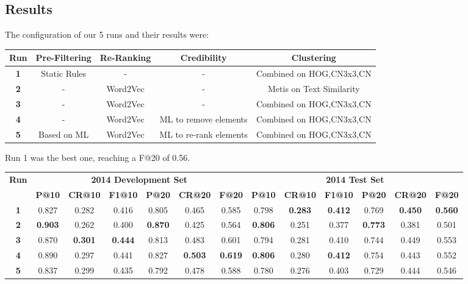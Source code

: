 \documentclass[a0,portrait]{a0poster}
\begin{document}
\begin{multicols}{2}

\color{Navy} %
\section*{Results}
\color{DarkSlateGray} %

The configuration of our 5 runs and their results were:
\begin{center} %
\label{table:config}
\normalsize
\begin{tabular}{c|c|c|c|c}
\toprule 
\textbf{Run} & \textbf{Pre-Filtering} & \textbf{Re-Ranking}  & \textbf{Credibility} & \textbf{Clustering}\tabularnewline
\midrule
\textbf{1} & Static Rules & - & - & Combined on HOG,CN3x3,CN \tabularnewline
\textbf{2} & - & Word2Vec & - & Metis on Text Similarity \tabularnewline
\textbf{3} & - & Word2Vec & - & Combined on HOG,CN3x3,CN \tabularnewline
\textbf{4} & - & Word2Vec &   ML to remove elements & Combined on HOG,CN3x3,CN\tabularnewline
\textbf{5} & Based on ML & Word2Vec  & ML to re-rank elements & Combined on HOG,CN3x3,CN\tabularnewline
\bottomrule 
\end{tabular}
\end{center} %

\vspace{1cm}
Run 1 was the best one, reaching a F@20 of 0.56.
\begin{center}
\normalsize
\begin{tabular}{c||c|c|c|c|c|c||c|c|c|c|c|c}
\toprule 
\multirow{2}{*}{\textbf{Run}} & \multicolumn{6}{c||}{\textbf{2014 Development Set}} & \multicolumn{6}{c}{\textbf{2014 Test Set}}\tabularnewline
\cmidrule{2-13} 
 & \textbf{P@10} & \textbf{CR@10} & \textbf{F1@10} & \textbf{P@20} & \textbf{CR@20} & \textbf{F@20} & \textbf{P@10} & \textbf{CR@10} & \textbf{F1@10} & \textbf{P@20} & \textbf{CR@20} & \textbf{F@20}\tabularnewline
\midrule
\rowcolor{LightCyan}
\textbf{1} & 0.827 & 0.282 & 0.416 & 0.805 & 0.465 & 0.585 & 0.798 & \textbf{0.283}  & \textbf{0.412}  & 0.769  & \textbf{0.450}  & \textbf{0.560} \tabularnewline
\textbf{2} & \textbf{0.903} & 0.262 & 0.400 & \textbf{0.870} & 0.425 & 0.564 & \textbf{0.806} & 0.251  & 0.377  & \textbf{0.773}  & 0.381  & 0.501 \tabularnewline
\textbf{3} & 0.870 & \textbf{0.301} & \textbf{0.444} & 0.813 & 0.483 & 0.601 & 0.794 & 0.281  & 0.410  & 0.744  & 0.449  & 0.553 \tabularnewline
\textbf{4} & 0.890 & 0.297 & 0.441 & 0.827 & \textbf{0.503} & \textbf{0.619} & \textbf{0.806} & 0.280 & \textbf{0.412} & 0.754  & 0.443 &  0.552   \tabularnewline
\textbf{5} & 0.837 & 0.299 & 0.435 & 0.792 & 0.478 & 0.588 & 0.780 & 0.276 & 0.403 & 0.729 & 0.444 &  0.546    \tabularnewline
\bottomrule 
\end{tabular}
\end{center}\vspace{1cm}


\end{multicols}
\end{document}
